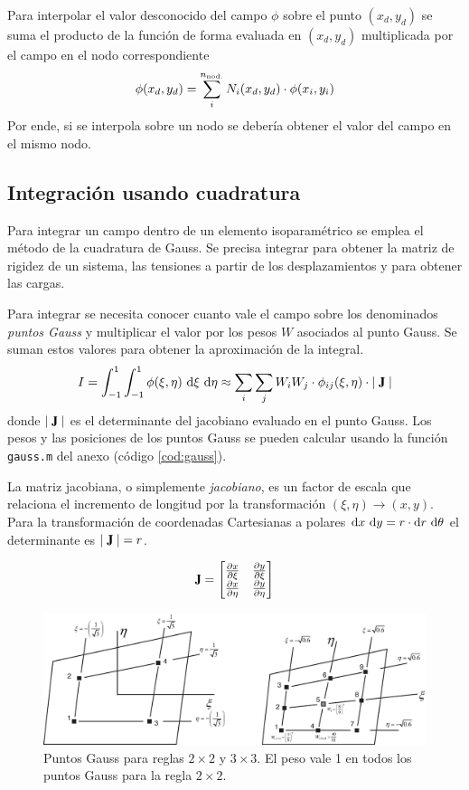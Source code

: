 Para interpolar el valor desconocido del campo $\phi$ sobre el punto $(x_d,y_d)$ se suma el producto de la función de forma evaluada en $(x_d,y_d)$ multiplicada por el campo en el nodo correspondiente
\[
\phi(x_d,y_d) = \sum_i^{n_{\mathrm{nod.}}} N_i(x_d,y_d) \cdot \phi(x_i,y_i) 
\]
Por ende, si se interpola sobre un nodo se debería obtener el valor del campo en el mismo nodo.


\subsection*{Integración usando cuadratura}
Para integrar un campo dentro de un elemento isoparamétrico se emplea el método de la cuadratura de Gauss. Se precisa integrar para obtener la matriz de rigidez de un sistema, las tensiones a partir de los desplazamientos y para obtener las cargas.

Para integrar se necesita conocer cuanto vale el campo sobre los denominados \textit{puntos Gauss} y multiplicar el valor por los pesos $W$ asociados al punto Gauss. Se suman estos valores para obtener la aproximación de la integral.
\begin{equation}
I=\int^1_{-1} \int^1_{-1}\phi(\xi,\eta)~ \di \xi~ \di \eta\approx \sum_i \sum_j W_i W_j \cdot \phi_{ij}(\xi,\eta) \cdot \Djac
\end{equation}
donde $\Djac$ es el determinante del jacobiano evaluado en el punto Gauss. Los pesos y las posiciones de los puntos Gauss se pueden calcular usando la función \texttt{gauss.m} del anexo (código \ref{cod:gauss}).

La matriz jacobiana, o simplemente \textit{jacobiano}, es un factor de escala que relaciona el incremento de longitud por la transformación $(\xi,\eta)\rightarrow(x,y)$. Para la transformación de coordenadas Cartesianas a polares $\textrm{d} x~ \textrm{d} y = r \cdot \textrm{d} r~  \textrm{d} \theta$ el determinante es $\Djac=r$.

\[
\jac = \begin{bmatrix}
\spartial{x}{\xi} & \spartial{y}{\xi} \\
\spartial{x}{\eta} & \spartial{y}{\eta}
\end{bmatrix}
\]

\begin{figure}[htb!]
	\centering
	\includegraphics[width=12cm]{fig/gauss_n3.eps}
	\caption{Puntos Gauss para reglas $2\times 2$ y $3\times3$. El peso vale 1 en todos los puntos Gauss para la regla $2\times2$.}
	\label{fig:gauss_n3}
\end{figure}



